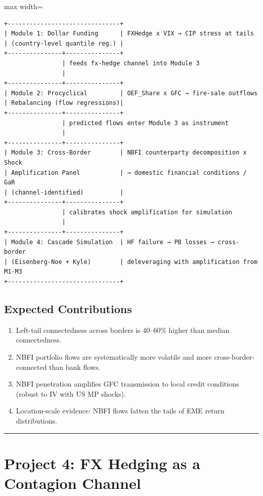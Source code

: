 \documentclass[11pt,a4paper]{article}
\begin{document}
\begin{adjustbox}{max width=\textwidth}
\begin{minipage}{1.5\textwidth}
\begin{verbatim}
+-------------------------------+
| Module 1: Dollar Funding      | FXHedge x VIX → CIP stress at tails
| (country-level quantile reg.) |
+---------------+---------------+
                | feeds fx-hedge channel into Module 3
                |
+---------------+---------------+
| Module 2: Procyclical         | OEF_Share x GFC → fire-sale outflows
| Rebalancing (flow regressions)|
+---------------+---------------+
                | predicted flows enter Module 3 as instrument
                |
+---------------+---------------+
| Module 3: Cross-Border        | NBFI counterparty decomposition x Shock
| Amplification Panel           | → domestic financial conditions / GaR
| (channel-identified)          |
+---------------+---------------+
                | calibrates shock amplification for simulation
                |
+---------------+---------------+
| Module 4: Cascade Simulation  | HF failure → PB losses → cross-border
| (Eisenberg-Noe + Kyle)        | deleveraging with amplification from M1-M3
+-------------------------------+
\end{verbatim}
\end{minipage}
\end{adjustbox}


\subsection{Expected Contributions}

\begin{enumerate}
\item Left-tail connectedness across borders is 40--60\% higher than median connectedness.
\item NBFI portfolio flows are systematically more volatile and more cross-border-connected than bank flows.
\item NBFI penetration amplifies GFC transmission to local credit conditions (robust to IV with US MP shocks).
\item Location-scale evidence: NBFI flows fatten the tails of EME return distributions.

\end{enumerate}

\bigskip\noindent\rule{\textwidth}{0.4pt}\bigskip


\section{Project 4: FX Hedging as a Contagion Channel}
\end{document}
